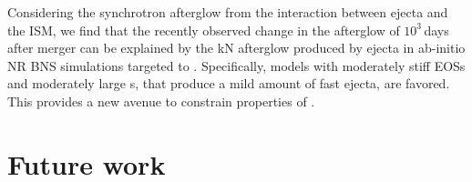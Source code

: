 Considering the synchrotron afterglow from the interaction between ejecta and the 
\ac{ISM}, we find that the recently observed change in the afterglow of \GRB{} 
$10^3\,$days after merger can be explained by the \ac{kN} afterglow produced by ejecta in 
ab-initio \ac{NR} \ac{BNS} simulations targeted to \GW{}. 
%
Specifically, models with moderately stiff \acp{EOS} and moderately large \mr{}s, 
that produce a mild amount of fast ejecta, are favored.
%
This provides a new avenue to constrain properties of \GW{}. 


\section*{Future work}

